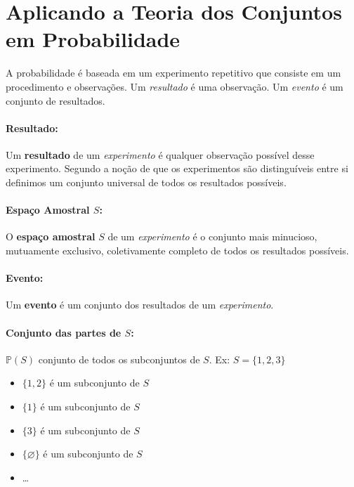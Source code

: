 \documentclass{article}
\renewcommand\bf[1]{\textbf{#1}}
\renewcommand\it[1]{\textit{#1}}
\newcommand{\vn}{\varnothing}
\begin{document}
\setlength{\abovedisplayskip}{12pt}
\setlength{\belowdisplayskip}{12pt}
\setlength{\abovedisplayshortskip}{0pt}
\setlength{\belowdisplayshortskip}{0pt}
\setlength{\jot}{0pt}

\section{Aplicando a Teoria dos Conjuntos em Probabilidade}
A probabilidade é baseada em um experimento repetitivo que consiste em um procedimento e
observações. Um \it{resultado} é uma observação. Um \it{evento} é um conjunto de resultados.

\paragraph{Resultado:}
Um \bf{resultado} de um \it{experimento} é qualquer observação possível desse experimento. Segundo
a noção de que os experimentos são distinguíveis entre si definimos um conjunto universal de todos
os resultados possíveis.

\paragraph{Espaço Amostral $S$:}
O \bf{espaço amostral} $S$ de um \it{experimento} é o conjunto mais minucioso, mutuamente
exclusivo, coletivamente completo de todos os resultados possíveis.

\paragraph{Evento:}
Um \bf{evento} é um conjunto dos resultados de um \it{experimento}.

\paragraph{Conjunto das partes de $S$:}
$\mathbb{P}(S)$ conjunto de todos os subconjuntos de $S$. Ex: $S = \{1,2,3\}$

\begin{itemize}
	\setlength\itemsep{-0.5em}
	\item $\{1,2\}$ é um subconjunto de $S$
	\item $\{1\}$ é um subconjunto de $S$
	\item $\{3\}$ é um subconjunto de $S$
	\item $\{\vn\}$ é um subconjunto de $S$
	\item \ldots
\end{itemize}
\end{document}
